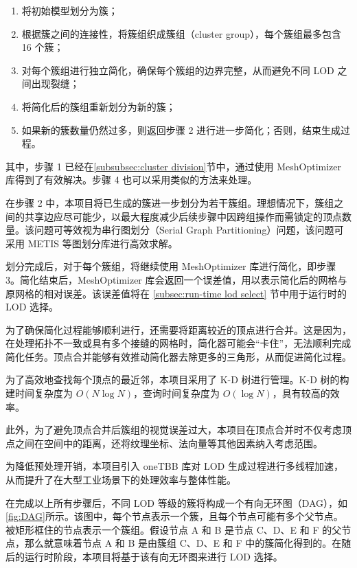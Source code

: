 \begin{enumerate}
    \item 将初始模型划分为簇；
    \item 根据簇之间的连接性，将簇组织成簇组（cluster group），每个簇组最多包含 16 个簇；
    \item 对每个簇组进行独立简化，确保每个簇组的边界完整，从而避免不同 LOD 之间出现裂缝；
    \item 将简化后的簇组重新划分为新的簇；
    \item 如果新的簇数量仍然过多，则返回步骤 2 进行进一步简化；否则，结束生成过程。
\end{enumerate}

其中，步骤 1 已经在\ref{subsubsec:cluster division}节中，通过使用 MeshOptimizer 库得到了有效解决。步骤 4 也可以采用类似的方法来处理。

在步骤 2 中，本项目将已生成的簇进一步划分为若干簇组。理想情况下，簇组之间的共享边应尽可能少，以最大程度减少后续步骤中因跨组操作而需锁定的顶点数量。该问题可等效视为串行图划分（Serial Graph Partitioning）问题，该问题可采用 METIS 等图划分库进行高效求解\cite{METIS}。

划分完成后，对于每个簇组，将继续使用 MeshOptimizer 库进行简化，即步骤 3。简化结束后，MeshOptimizer 库会返回一个误差值，用以表示简化后的网格与原网格的相对误差。该误差值将在 \ref{subsec:run-time lod select} 节中用于运行时的 LOD 选择。

为了确保简化过程能够顺利进行，还需要将距离较近的顶点进行合并。这是因为，在处理拓扑不一致或具有多个接缝的网格时，简化器可能会“卡住”，无法顺利完成简化任务。顶点合并能够有效推动简化器去除更多的三角形，从而促进简化过程。

为了高效地查找每个顶点的最近邻，本项目采用了 K-D 树进行管理\cite{bentley1975}。K-D 树的构建时间复杂度为 $O(N\log N)$，查询时间复杂度为 $O(\log N)$，具有较高的效率。

此外，为了避免顶点合并后簇组的视觉误差过大，本项目在顶点合并时不仅考虑顶点之间在空间中的距离，还将纹理坐标、法向量等其他因素纳入考虑范围。

为降低预处理开销，本项目引入 oneTBB 库对 LOD 生成过程进行多线程加速，从而提升了在大型工业场景下的处理效率与整体性能\cite{oneTBB}。

在完成以上所有步骤后，不同 LOD 等级的簇将构成一个有向无环图（DAG），如\autoref{fig:DAG}所示\cite{WangXi2022}。该图中，每个节点表示一个簇，且每个节点可能有多个父节点。被矩形框住的节点表示一个簇组。假设节点 A 和 B 是节点 C、D、E 和 F 的父节点，那么就意味着节点 A 和 B 是由簇组 C、D、E 和 F 中的簇简化得到的。在随后的运行时阶段，本项目将基于该有向无环图来进行 LOD 选择。

